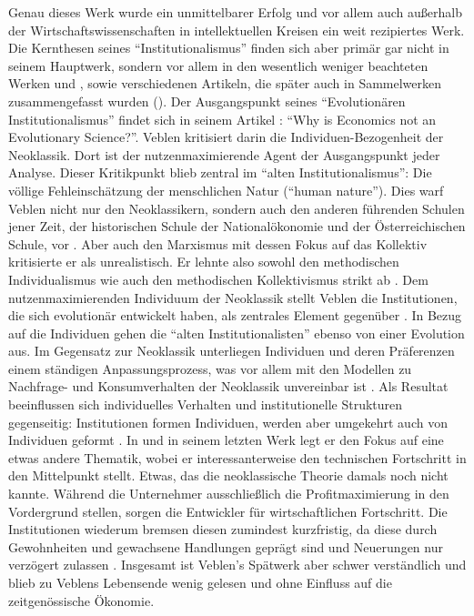 Genau dieses Werk \parencite{Veblen1899} wurde ein unmittelbarer Erfolg und vor allem auch außerhalb der Wirtschaftswissenschaften in intellektuellen Kreisen ein weit rezipiertes Werk. Die Kernthesen seines "`Institutionalismus"' finden sich aber primär gar nicht in seinem Hauptwerk, sondern vor allem in den wesentlich weniger beachteten Werken \textcite{Veblen1904} und \textcite{Veblen1923}, sowie verschiedenen Artikeln, die später auch in Sammelwerken zusammengefasst wurden (\textcite{Veblen1919}). Der Ausgangspunkt seines "`Evolutionären Institutionalismus"' findet sich in seinem Artikel \textcite{Veblen1898}: "`Why is Economics not an Evolutionary Science?"'. Veblen kritisiert darin die Individuen-Bezogenheit der Neoklassik. Dort ist der nutzenmaximierende Agent der Ausgangspunkt jeder Analyse. Dieser Kritikpunkt blieb zentral im "`alten Institutionalismus"': Die völlige Fehleinschätzung der menschlichen Natur ("`human nature"'). Dies warf Veblen nicht nur den Neoklassikern, sondern auch den anderen führenden Schulen jener Zeit, der historischen Schule der Nationalökonomie und der Österreichischen Schule, vor \parencite[S. 389]{Veblen1898}. Aber auch den Marxismus mit dessen Fokus auf das Kollektiv kritisierte er als unrealistisch. Er lehnte also sowohl den methodischen Individualismus wie auch den methodischen Kollektivismus strikt ab \parencite[S. 426]{Hodgson1998b}. Dem nutzenmaximierenden Individuum der Neoklassik stellt Veblen die Institutionen, die sich evolutionär entwickelt haben, als zentrales Element gegenüber \parencite[S. 422]{Hodgson1998b}. In Bezug auf die Individuen gehen die "`alten Institutionalisten"' ebenso von einer Evolution aus. Im Gegensatz zur Neoklassik unterliegen Individuen und deren Präferenzen einem ständigen Anpassungsprozess, was vor allem mit den Modellen zu Nachfrage- und Konsumverhalten der Neoklassik unvereinbar ist \parencite[S. 701]{Blaug1962}. Als Resultat beeinflussen sich individuelles Verhalten und institutionelle Strukturen gegenseitig: Institutionen formen Individuen, werden aber umgekehrt auch von Individuen geformt \parencite[S. 181]{Hodgson1998}. In \textcite{Veblen1904} und in seinem letzten Werk \textcite{Veblen1923} legt er den Fokus auf eine etwas andere Thematik, wobei er interessanterweise den technischen Fortschritt in den Mittelpunkt stellt. Etwas, das die neoklassische Theorie damals noch nicht kannte. Während die Unternehmer ausschließlich die Profitmaximierung in den Vordergrund stellen, sorgen die Entwickler für wirtschaftlichen Fortschritt. Die Institutionen wiederum bremsen diesen zumindest kurzfristig, da diese durch Gewohnheiten und gewachsene Handlungen geprägt sind und Neuerungen nur verzögert zulassen \parencite[S. 34]{Erlei2016}. Insgesamt ist Veblen's Spätwerk aber schwer verständlich und blieb zu Veblens Lebensende wenig gelesen und ohne Einfluss auf die zeitgenössische Ökonomie.

